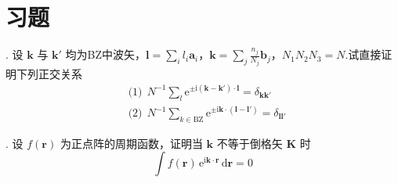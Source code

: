 %
\chapter*{习题}

{.} 设 $\boldsymbol{k}$ 与 $\boldsymbol{k}'$ 均为BZ中波矢，$\boldsymbol{l}=\sum_{i}l_{i}\boldsymbol{a}_{i}$，$\boldsymbol{k}=\sum_{j}\frac{n_{j}}{N_{j}}\boldsymbol{b}_{j}$，$N_{1}N_{2}N_{3}=N$.试直接证明下列正交关系
\begin{equation*}
\begin{aligned}
  &\text{(1)}\ \ N^{-1}\sum_{l}\mathrm{e}^{\pm\mathrm{i}(\boldsymbol{k}-\boldsymbol{k}')\cdot\boldsymbol{l}}=\delta_{\boldsymbol{k}\boldsymbol{k}'}\\
  &\text{(2)}\ \ N^{-1}\sum_{k\in\mathrm{BZ}}\mathrm{e}^{\pm\mathrm{i}\boldsymbol{k}\cdot(\boldsymbol{l}-\boldsymbol{l}')}=\delta_{\boldsymbol{l}\boldsymbol{l}'}
\end{aligned}
\end{equation*}

{.} 设 $f(\boldsymbol{r})$ 为正点阵的周期函数，证明当 $\boldsymbol{k}$ 不等于倒格矢 $\boldsymbol{K}$ 时
\begin{equation*}
  \int f(\boldsymbol{r})\,\mathrm{e}^{\mathrm{i}\boldsymbol{k}\cdot\boldsymbol{r}}\,\mathrm{d}\boldsymbol{r}=0
\end{equation*}

